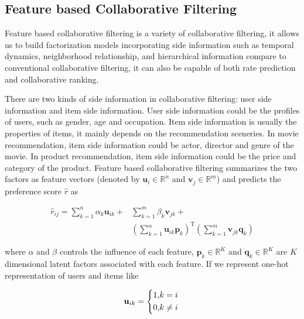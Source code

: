 \documentclass{llncs}
\begin{document}
\subsection{Feature based Collaborative Filtering}
Feature based collaborative filtering \cite{chen2011feature, chen2012svdfeature} is a variety of
collaborative filtering, it allows us to build factorization models incorporating
side information such as temporal dynamics, neighborhood relationship,
and hierarchical information compare to conventional collaborative filtering,
it can also be capable of both rate prediction and collaborative ranking.

There are two kinds of side information in collaborative filtering:
user side information and item side information.
User side information could be the profiles of users, such as
gender, age and occupation.
Item side information is usually the properties of items,
it mainly depends on the recommendation sceneries.
In movie recommendation, item side information could be actor, director and genre
of the movie. In product recommendation, item side information could be the price
and category of the product.
Feature based collaborative filtering summarizes the two factors as feature vectors
(denoted by $\mathbf{u}_i \in \mathbb{R}^{n}$ and $\mathbf{v}_j \in \mathbb{R}^{m}$) and predicts
the preference score $\hat{r}$ as

\begin{equation}
\begin{aligned}
\hat{r}_{ij} = \sum_{k=1}^{n} \alpha_k \mathbf{u}_{ik} + &\sum_{k=1}^{m} \beta_k \mathbf{v}_{jk} + \\
&\left( \sum_{k=1}^{n} \mathbf{u}_{ik} \mathbf{p}_k \right) ^ \mathrm{T}
\left( \sum_{k=1}^{m} \mathbf{v}_{jk} \mathbf{q}_k \right)
\end{aligned}
\end{equation}

where $\alpha$ and $\beta$ controls the influence of each feature,
$\mathbf{p}_{k} \in \mathbb{R}^K$ and $\mathbf{q}_{k} \in \mathbb{R}^K$
are $K$ dimensional latent factors associated with each feature.
If we represent one-hot representation of users and items like

\begin{equation}
\mathbf{u}_{ik} =
\left\{
\begin{aligned}
1, &k = i \\
0, &k \not= i
\end{aligned}
\right. \\
\end{equation}
\end{document}
